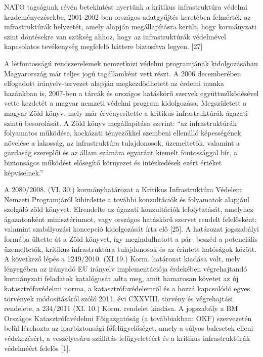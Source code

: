\documentclass[12pt,magyar,a4paper,oneside]{scrreprt}
\begin{document}
NATO tagságunk révén betekintést nyertünk a kritikus infrastruktúra
védelmi kezdeményezésekbe, 2001-2002-ben országos adatgyűjtés keretében
felmérték az infrastruktúrák helyzetét, amely alapján megállapításra
került, hogy kormányzati szint döntésekre van szükség ahhoz, hogy az
infrastruktúrák védelmével kapcsolatos tevékenység megfelelő háttere
biztosítva legyen. {[}27{]}

A létfontosságú rendszerelemek nemzetközi védelmi programjának
kidolgozásában Magyarország már teljes jogú tagállamként vett részt. A
2006 decemberében elfogadott irányelv-tervezet alapján megkezdődhetett
az érdemi munka hazánkban is, 2007-ben a tárcák és országos hatáskörű
szervek együttműködésével vette kezdetét a magyar nemzeti védelmi
program kidolgozása. Megszületett a magyar Zöld könyv, mely már
érvényesítette a kritikus infrastruktúrák ágazati szintű besorolását. A
Zöld könyv megállapítása szerint: ``az infrastruktúrák folyamatos
működése, kockázati tényezőkkel szembeni ellenálló képességének növelése
a lakosság, az infrastruktúra tulajdonosok, üzemeltetők, valamint a
gazdaság szereplői és az állam számára egyaránt kiemelt fontossággal
bír, a biztonságos működést elősegítő környezet és intézkedések ezért
értéket képviselnek.''

A 2080/2008. (VI. 30.) kormányhatározat a Kritikus Infrastruktúra
Védelem Nemzeti Programjáról kihirdette a további konzultációk és
folyamatok alapjául szolgáló zöld könyvet. Elrendelte az ágazati
konzultációk lefolytatását, amelyhez ágazatonként minisztériumot, vagy
országos hatáskörű szervet rendelt felelősként; valamint szabályozási
koncepció kidolgozását írta elő {[}25{]}. A határozat jogszabályi
formába ültette át a Zöld könyvet, így megindulhatott a pár- beszéd a
potenciális üzemeltetők, kritikus infrastruktúra tulajdonosok és az
érintett hatóságok között. A következő lépés a 1249/2010. (XI.19.) Korm.
határozat kiadása volt, mely lényegében az irányadó EU irányelv
implementációja érdekében végrehajtandó kormányzati feladatok
katalógusát adta meg, amit hamarosan követet az új katasztrófavédelmi
norma, a katasztrófavédelemről és a hozzá kapcsolódó egyes törvények
módosításáról szóló 2011. évi CXXVIII. törvény és végrehajtási
rendelete, a 234/2011 (XI. 10.) Korm. rendelet kiadása. A jogszabály a
BM Országos Katasztrófavédelmi Főigazgatóság (a továbbiakban: OKF)
szervezetén belül lérehozta az iparbiztonsági főfelügyelőséget, amely a
súlyos balesetek elleni védekezésért, a veszélyesáru-szállítás
felügyeletéért és a kritikus infrastruktúrák védelméért felelős {[}1{]}.
\end{document}
